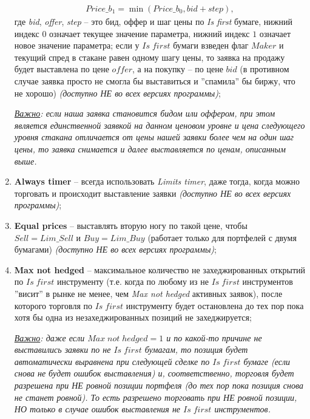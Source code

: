 \begin{enumerate}
\begin{align*}
			Price\_b_1 = \min(Price\_b_0, bid + step), 
		\end{align*}
		где \textit{bid}, \textit{offer}, \textit{step} -- это бид, оффер и шаг цены по \textit{Is first} бумаге, нижний индекс $0$ означает текущее значение параметра, нижний индекс $1$ означает
		новое значение параметра; если у $Is \; first$ бумаги взведен флаг $Maker$ и текущий спред в стакане равен одному шагу цены, то заявка на продажу будет выставлена по цене
		$offer$, а на покупку -- по цене $bid$ (в противном случае заявка просто не смогла бы выставиться и ''спамила'' бы биржу, что не хорошо) \textit{(доступно НЕ во всех версиях программы)};
	
	\textit{\underline{Важно}: если наша заявка становится бидом или оффером, при этом является единственной заявкой на данном ценовом уровне и цена следующего
		уровня стакана отличается от цены нашей заявки более чем на один шаг цены, то заявка снимается и далее выставляется по ценам, описанным выше.}
\ifdefined \Ramiz
	\item \textbf{Always timer} -- всегда использовать \textit{Limits timer}, даже тогда, когда можно торговать и происходит выставление заявки \textit{(доступно НЕ во всех версиях программы)};
	\item \textbf{Equal prices} -- выставлять вторую ногу по такой цене, чтобы $Sell = Lim\_Sell$ и $Buy = Lim\_Buy$ (работает только для портфелей с двумя бумагами) \textit{(доступно НЕ во всех версиях программы)};
\else
\fi
	\item \textbf{Max not hedged} -- максимальное количество не захеджированных открытий по $Is \; first$ инструменту
		(т.е. когда по любому из не $Is \; first$ инструментов ''висит'' в рынке не менее, чем \textit{Max not hedged} активных заявок), после которого
		торговля по $Is \; first$ инструменту будет остановлена до тех пор пока хотя бы одна из незахеджированных позиций не захеджируется;
		
	\textit{\underline{Важно}: даже если $Max \; not \; hedged = 1$ и по какой-то причине не выставились заявки по не $Is \; first$ бумагам,
		то позиция будет автоматически выравнена при следующей сделке по $Is \; first$ бумаге (если снова не будет ошибок выставления) и, соответственно,
		торговля будет разрешена при НЕ ровной позиции портфеля (до тех пор пока позиция снова не станет ровной). То есть разрешено торговать при НЕ ровной
		позиции, НО только в случае ошибок выставления не $Is \; first$ инструментов.}


\end{enumerate}
